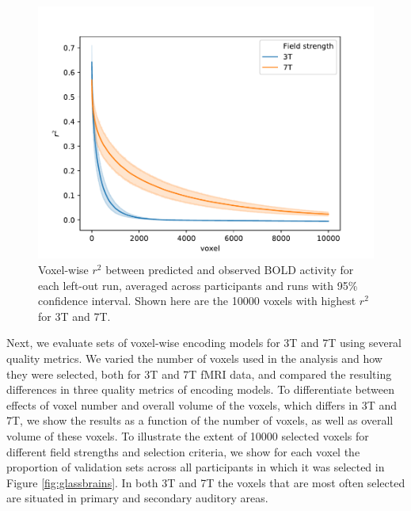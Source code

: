 \begin{figure}
  \centering
  \includegraphics[width=\linewidth]{pics/r2_plot.pdf}
	
    \caption{Voxel-wise $r^{2}$ between predicted and observed BOLD activity for each left-out run, averaged across participants and runs with 95\% confidence interval. Shown here are the 10000 voxels with highest $r^{2}$ for 3T and 7T.
  }

 \label{fig:r2_plot}\end{figure}

Next, we evaluate sets of voxel-wise encoding models for 3T and 7T using several quality metrics. We varied the number of voxels used in the analysis and how they were selected, both for 3T and 7T f{MRI} data, and compared the resulting differences in three quality metrics of encoding models. To differentiate between effects of voxel number and overall volume of the voxels, which differs in 3T and 7T, we show the results as a function of the number of voxels, as well as overall volume of these voxels.
To illustrate the extent of 10000 selected voxels for different field strengths and selection criteria, we show for each voxel the proportion of validation sets across all participants in which it was selected in Figure \ref{fig:glassbrains}. In both 3T and 7T the voxels that are most often selected are situated in primary and secondary auditory areas.

